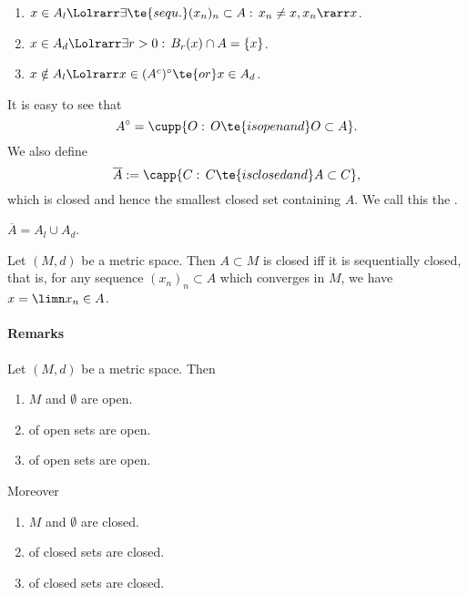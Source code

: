 \begin{lem}\label{i.7}
\begin{enumerate}[label=\alph*)]
    \item \label{i.7.a}$x\in A_l\Lolrarr\exists\te{sequ. }(x_n)_n\subset A:\, x_n\neq x,x_n\rarr x$.\label{1.7.a}
    \item $x\in A_d\Lolrarr\exists r>0:\, B_r(x)\cap A=\{x\}$.\label{1.7.b}
    \item $x\notin A_l\Lolrarr x\in (A^c)^\circ\te{ or }x\in A_d$.\label{1.7.c}
\end{enumerate}
\end{lem}

\begin{lem}\label{i.8}
It is easy to see that
\[A^\circ=\cupp\{O:\,O\te{ is open and }O\subset A\}.\]
We also define
\[\overline{A}:=\capp\{C:\, C\te{ is closed and }A\subset C\},\]
which is closed and hence the smallest closed set containing $A$. 
We call this the .

$\overline{A}=A_l\cup A_d$.
\end{lem}

\begin{thm}\label{i.9}
Let $(M,d)$ be a metric space. Then $A\subset M$ is closed iff it is sequentially closed, 
that is, for any sequence $(x_n)_n\subset A$ which converges in $M$, we have $x=\limn x_n\in A$.
\end{thm}

\paragraph{Remarks}
Let $(M,d)$ be a metric space. Then
\begin{enumerate}[label=\alph*)]
    \item $M$ and $\emptyset$ are open.\label{p.1.a}
    \item {} of open sets are open.\label{p.1.b}
    \item {} of open sets are open.\label{p.1.c}
\end{enumerate}
Moreover
\begin{enumerate}[label=\alph*')] 
    \item $M$ and $\emptyset$ are closed.\label{p.2.a}
    \item {} of closed sets are closed.\label{p.2.b}
    \item {} of closed sets are closed.\label{p.2.c}
\end{enumerate}

